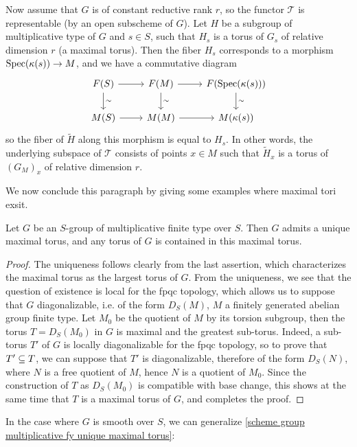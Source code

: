 \begin{remark}
Now assume that $G$ is of constant reductive rank $r$, so the functor $\mathscr{T}$ is representable (by an open subscheme of $G$). Let $H$ be a subgroup of multiplicative type of $G$ and $s\in S$, such that $H_s$ is a torus of $G_s$ of relative dimension $r$ (a maximal torus). Then the fiber $H_s$ corresponds to a morphism $\mathrm{Spec}(\kappa(s))\to M$, and we have a commutative diagram
\[\begin{tikzcd}
F(S)\ar[d,"\sim"]\ar[r]&F(M)\ar[d,"\sim"]\ar[r]&F(\Spec(\kappa(s)))\ar[d,"\sim"]\\
M(S)\ar[r]&M(M)\ar[r]&M(\kappa(s))
\end{tikzcd}\]
so the fiber of $\widetilde{H}$ along this morphism is equal to $H_s$. In other words, the underlying subspace of $\mathscr{T}$ consists of points $x\in M$ such that $\widetilde{H}_x$ is a torus of $(G_M)_x$ of relative dimension $r$.
\end{remark}

We now conclude this paragraph by giving some examples where maximal tori exsit.

\begin{proposition}\label{scheme group multiplicative fy unique maximal torus}
Let $G$ be an $S$-group of multiplicative finite type over $S$. Then $G$ admits a unique maximal torus, and any torus of $G$ is contained in this maximal torus. 
\end{proposition}
\begin{proof}
The uniqueness follows clearly from the last assertion, which characterizes the maximal torus as the largest torus of $G$. From the uniqueness, we see that the question of existence is local for the fpqc topology, which allows us to suppose that $G$ diagonalizable, i.e. of the form $D_S(M)$, $M$ a finitely generated abelian group finite type. Let $M_0$ be the quotient of $M$ by its torsion subgroup, then the torus $T=D_S(M_0)$ in $G$ is maximal and the greatest sub-torus. Indeed, a sub-torus $T'$ of $G$ is locally diagonalizable for the fpqc topology, so to prove that $T'\subseteq T$, we can suppose that $T'$ is diagonalizable, therefore of the form $D_S(N)$, where $N$ is a free quotient of $M$, hence $N$ is a quotient of $M_0$. Since the construction of $T$ as $D_S(M_0)$ is compatible with base change, this shows at the same time that $T$ is a maximal torus of $G$, and completes the proof. 
\end{proof}

In the case where $G$ is smooth over $S$, we can generalize \cref{scheme group multiplicative fy unique maximal torus}:

